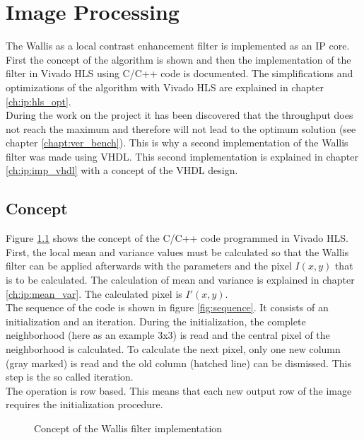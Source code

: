 %
%
\chapter{Image Processing}  \label{chapt:image_processing}
The Wallis as a local contrast enhancement filter is implemented as an IP core. First the concept of the algorithm is shown and then the implementation of the filter in Vivado HLS using C/C++ code is documented. The simplifications and optimizations of the algorithm with Vivado HLS are explained in chapter \ref{ch:ip:hls_opt}. \\
During the work on the project it has been discovered that the throughput does not reach the maximum and therefore will not lead to the optimum solution (see chapter \ref{chapt:ver_bench}). This is why a second implementation of the Wallis filter was made using VHDL. This second implementation is explained in chapter \ref{ch:ip:imp_vhdl} with a concept of the VHDL design.

\section{Concept} \label{ch:ip:concept}
Figure \ref{fig:concept} shows the concept of the C/C++ code programmed in Vivado HLS. First, the local mean and variance values must be calculated so that the Wallis filter can be applied afterwards with the parameters and the pixel $I(x,y)$ that is to be calculated. The calculation of mean and variance is explained in chapter \ref{ch:ip:mean_var}. The calculated pixel is $I'(x,y)$. \\
The sequence of the code is shown in figure \ref{fig:sequence}. It consists of an initialization and an iteration. During the initialization, the complete neighborhood (here as an example 3x3) is read and the central pixel of the neighborhood is calculated. To calculate the next pixel, only one new column (gray marked) is read and the old column (hatched line) can be dismissed. This step is the so called iteration.\\
The operation is row based. This means that each new output row of the image requires the initialization procedure.

\begin{figure}[tb!]
    \centering
    \begin{adjustbox}{max width=\textwidth}
        
    \end{adjustbox}
    \caption{Concept of the Wallis filter implementation}
    \label{fig:concept}
\end{figure}

